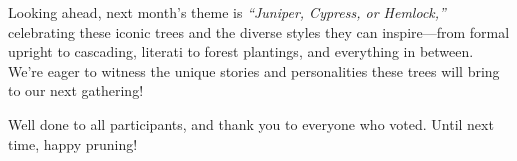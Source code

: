 Looking ahead, next month’s theme is \textit{``Juniper, Cypress, or Hemlock,''} celebrating these iconic trees and the diverse styles they can inspire---from formal upright to cascading, literati to forest plantings, and everything in between.
We're eager to witness the unique stories and personalities these trees will bring to our next gathering!

Well done to all participants, and thank you to everyone who voted.
Until next time, happy pruning!

\closearticle

\columnbreak
